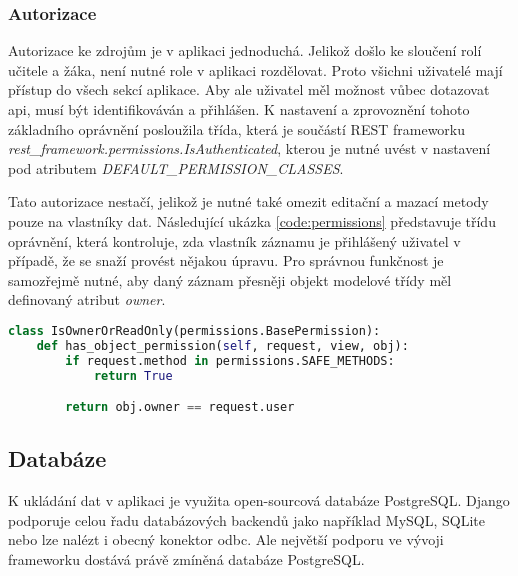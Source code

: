 \documentclass[a4paper,11pt,titlepage,fleqn]{article}
\begin{document}
        \subsubsection{Autorizace}
            Autorizace ke zdrojům je v aplikaci jednoduchá. Jelikož došlo ke sloučení rolí učitele a žáka, není nutné role v aplikaci rozdělovat. Proto všichni uživatelé mají přístup do všech sekcí aplikace. Aby ale uživatel měl možnost vůbec dotazovat \gls{api}, musí být identifikováván a přihlášen. K nastavení a zprovoznění tohoto základního oprávnění posloužila třída, která je součástí REST frameworku \textit{rest\_framework.permissions.IsAuthenticated}, kterou je nutné uvést v nastavení pod atributem \textit{DEFAULT\_PERMISSION\_CLASSES}. 

            Tato autorizace nestačí, jelikož je nutné také omezit editační a mazací metody pouze na vlastníky dat. Následující ukázka \ref{code:permissions} představuje třídu oprávnění, která kontroluje, zda vlastník záznamu je přihlášený uživatel v případě, že se snaží provést nějakou úpravu. Pro správnou funkčnost je samozřejmě nutné, aby daný záznam přesněji objekt modelové třídy měl definovaný atribut \textit{owner}.

\begin{minipage}[c]{0.95\textwidth}
\begin{lstlisting}[language=Python, caption={Ukázka třídy s přizpůsobeným oprávněním},label=code:permissions]
class IsOwnerOrReadOnly(permissions.BasePermission):
    def has_object_permission(self, request, view, obj):
        if request.method in permissions.SAFE_METHODS:
            return True

        return obj.owner == request.user
\end{lstlisting}
\end{minipage}

    \subsection{Databáze}
        \label{db}
        K ukládání dat v aplikaci je využita open-sourcová databáze PostgreSQL. Django podporuje celou řadu databázových backendů jako například MySQL, SQLite nebo lze nalézt i obecný konektor \gls{odbc}. Ale největší podporu ve vývoji frameworku dostává právě zmíněná databáze PostgreSQL\cite{bib:django}. 
\end{document}
